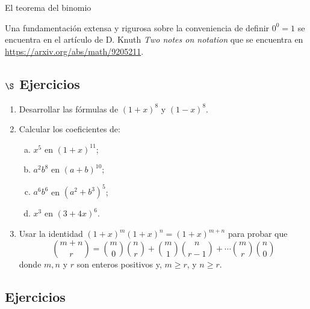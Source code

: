 \begin{section}{El teorema del binomio}
\begin{observacion}[Definición de $0^0$]
	Una fundamentación extensa y rigurosa sobre la conveniencia de definir $0^0 =1$ se encuentra en el artículo de D. Knuth \textit{Two notes on notation} que se encuentra en \href{https://arxiv.org/abs/math/9205211}{https://arxiv.org/abs/math/9205211}.
\end{observacion}

\subsection*{\Large $\S$ Ejercicios}\label{ej3.6.1}

	
	
\begin{enumerate}[1)]
\item Desarrollar las fórmulas de $(1+x)^8$ y $(1-x)^8$.

\item Calcular los coeficientes de:
\begin{multicols}{2}
\begin{enumerate}[a)]
	\item $x^5$ en $(1+x)^{11}$;
	
	\item $a^2b^8 $ en $(a+b)^{10}$;
	
	\item $a^6 b^6$ en $(a^2 +b^3)^5$;
	
	\item $x^3$ en $(3+4x)^6$.
\end{enumerate}	
\end{multicols}
\item Usar la identidad $(1+x)^m(1+x)^n=(1+x)^{m+n}$ para probar que
$$
\binom{m+n}{r} =
\binom{m}{0}\binom{n}{r}+\binom{m}{1}\binom{n}{r-1}+\cdots
\binom{m}{r}\binom{n}{0}
$$
donde $m,n$ y $r$ son enteros positivos y, $m\ge r$, y $n \ge r$.
\end{enumerate}


\section{Ejercicios}

\begin{enumerate}[1)]


\end{enumerate}
\end{section}
